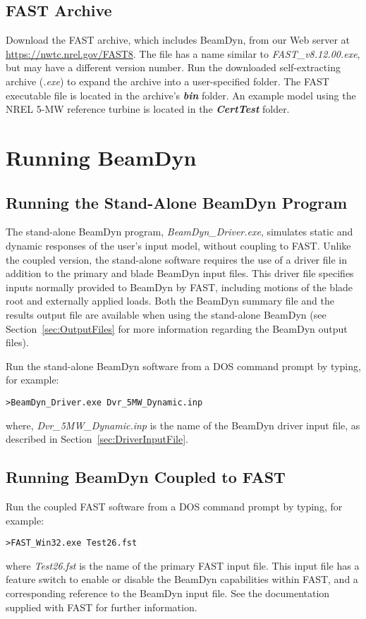 \subsection{FAST Archive}
Download the FAST archive, which includes BeamDyn, from our Web server at \url{https://nwtc.nrel.gov/FAST8}. 
The file has a name similar to \textit{FAST\_v8.12.00.exe}, but may have a different version number. 
Run the downloaded self-extracting archive ({\it .exe}) to expand the archive into a user-specified folder. 
The FAST executable file is located in the archive's \textbf{{\it bin}} folder. 
An example model using the NREL 5-MW reference turbine is located in the \textbf{{\it CertTest}} folder.

\section{Running BeamDyn}
\subsection{Running the Stand-Alone BeamDyn Program}
The stand-alone BeamDyn program, {\it BeamDyn\_Driver.exe}, simulates static and dynamic responses of the user's input model, without coupling to FAST. 
Unlike the coupled version, the stand-alone software requires the use of a driver file in addition to the primary and blade BeamDyn input files. 
This driver file specifies inputs normally provided to BeamDyn by FAST, including motions of the blade root and externally applied loads. 
Both the BeamDyn summary file and the results output file are available when using the stand-alone BeamDyn (see Section~\ref{sec:OutputFiles} for more information regarding the BeamDyn output files).

Run the stand-alone BeamDyn software from a DOS command prompt by typing, for example:
\begin{verbatim}
>BeamDyn_Driver.exe Dvr_5MW_Dynamic.inp
\end{verbatim}
where, {\it Dvr\_5MW\_Dynamic.inp} is the name of the BeamDyn driver input file, as described in Section~\ref{sec:DriverInputFile}.

\subsection{Running BeamDyn Coupled to FAST}
Run the coupled FAST software from a DOS command prompt by typing, for example:
\begin{verbatim}
>FAST_Win32.exe Test26.fst
\end{verbatim}
where {\it Test26.fst} is the name of the primary FAST input file. This input file has a feature switch to enable or disable the BeamDyn capabilities within FAST, and a corresponding reference to the BeamDyn input file. See the documentation supplied with FAST for further information.




